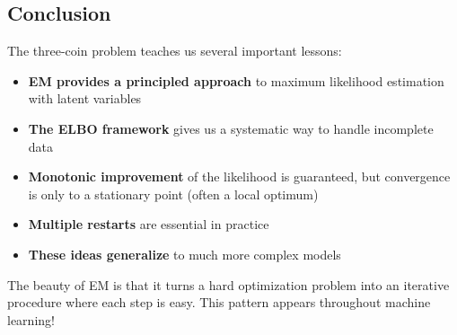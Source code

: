 \begin{notechapter}
\section{Conclusion}

The three-coin problem teaches us several important lessons:

\begin{itemize}
    \item \textbf{EM provides a principled approach} to maximum likelihood estimation with latent variables
    \item \textbf{The ELBO framework} gives us a systematic way to handle incomplete data
        \item \textbf{Monotonic improvement} of the likelihood is guaranteed, but convergence is only to a stationary point (often a local optimum)
    \item \textbf{Multiple restarts} are essential in practice
    \item \textbf{These ideas generalize} to much more complex models
\end{itemize}

The beauty of EM is that it turns a hard optimization problem into an iterative procedure where each step is easy. This pattern appears throughout machine learning!
\end{notechapter}
